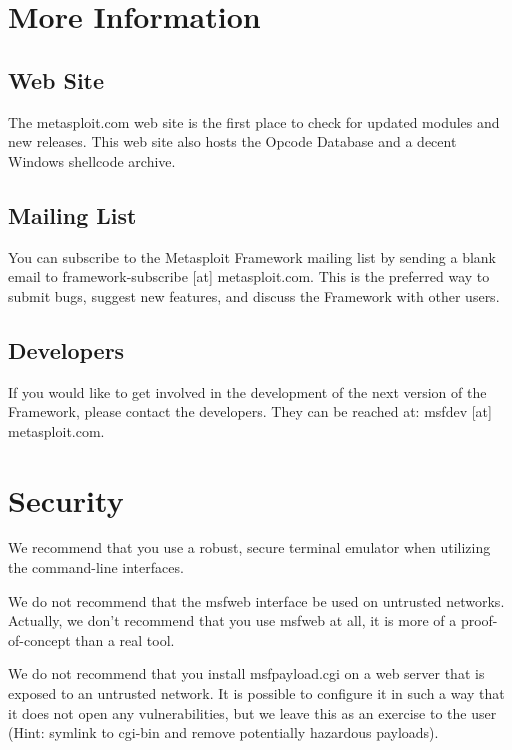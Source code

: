 \documentclass{report}
\begin{document}
\pagebreak
\chapter{More Information}


\section{Web Site}
\par
The metasploit.com web site is the first place to check for updated modules and
new releases. This web site also hosts the Opcode Database and a decent Windows
shellcode archive.  

\section{Mailing List}
\par
You can subscribe to the Metasploit Framework mailing list by sending a blank
email to framework-subscribe [at] metasploit.com. This is the preferred way to
submit bugs, suggest new features, and discuss the Framework with other users. 

\section{Developers}
\par
If you would like to get involved in the development of the next version of the Framework, please contact the developers. They can be reached at: 
msfdev [at] metasploit.com.

\pagebreak
\appendix

\pagebreak
\chapter{Security}

\par
We recommend that you use a robust, secure terminal emulator when
utilizing the command-line interfaces. 

\par
We do not recommend that the msfweb interface be used on untrusted
networks. Actually, we don't recommend that you use msfweb at all, it is
more of a proof-of-concept than a real tool.

\par
We do not recommend that you install msfpayload.cgi on a web server that
is exposed to an untrusted network. It is possible to configure it in such a
way that it does not open any vulnerabilities, but we leave this as an
exercise to the user (Hint: symlink to cgi-bin and remove potentially
hazardous payloads).
\end{document}

